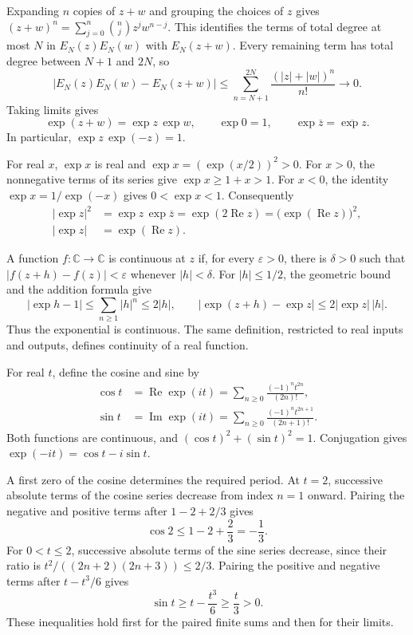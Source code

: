 Expanding $n$ copies of $z+w$ and grouping the choices of $z$ gives
$(z+w)^n=\sum_{j=0}^n\binom nj z^j w^{n-j}$.
This identifies the terms of total degree at most $N$ in
$E_N(z)E_N(w)$ with $E_N(z+w)$.
Every remaining term has total degree between $N+1$ and $2N$, so
\[
 |E_N(z)E_N(w)-E_N(z+w)|
 \leq\sum_{n=N+1}^{2N}\frac{(|z|+|w|)^n}{n!}\longrightarrow0.
\]
Taking limits gives
\[
 \exp(z+w)=\exp z\,\exp w,\qquad
 \exp0=1,\qquad
 \exp\overline z=\overline{\exp z}.
\]
In particular, $\exp z\,\exp(-z)=1$.

For real $x$, $\exp x$ is real and
$\exp x=(\exp(x/2))^2>0$.
For $x>0$, the nonnegative terms of its series give
$\exp x\geq1+x>1$.
For $x<0$, the identity $\exp x=1/\exp(-x)$ gives $0<\exp x<1$.
Consequently
\[
 \begin{aligned}
 |\exp z|^2
   &=\exp z\,\exp\overline z
     =\exp(2\operatorname{Re}z)
     =\bigl(\exp(\operatorname{Re}z)\bigr)^2,\\
 |\exp z|&=\exp(\operatorname{Re}z).
 \end{aligned}
\]

A function $f:\mathbb C\to\mathbb C$ is continuous at $z$ if, for every
$\varepsilon>0$, there is $\delta>0$ such that
$|f(z+h)-f(z)|<\varepsilon$ whenever $|h|<\delta$.
For $|h|\leq1/2$, the geometric bound and the addition formula give
\[
 |\exp h-1|\leq\sum_{n\geq1}|h|^n\leq2|h|,\qquad
 |\exp(z+h)-\exp z|\leq2|\exp z|\,|h|.
\]
Thus the exponential is continuous.
The same definition, restricted to real inputs and outputs, defines
continuity of a real function.

For real $t$, define the cosine and sine by
\[
 \begin{aligned}
 \cos t&=\operatorname{Re}\exp(it)
       =\sum_{n\geq0}\frac{(-1)^nt^{2n}}{(2n)!},\\
 \sin t&=\operatorname{Im}\exp(it)
       =\sum_{n\geq0}\frac{(-1)^nt^{2n+1}}{(2n+1)!}.
 \end{aligned}
\]
Both functions are continuous, and $(\cos t)^2+(\sin t)^2=1$.
Conjugation gives $\exp(-it)=\cos t-i\sin t$.

A first zero of the cosine determines the required period.
At $t=2$, successive absolute terms of the cosine series decrease
from index $n=1$ onward.
Pairing the negative and positive terms after $1-2+2/3$ gives
\[
 \cos2\leq1-2+\frac23=-\frac13.
\]
For $0<t\leq2$, successive absolute terms of the sine series decrease,
since their ratio is $t^2/((2n+2)(2n+3))\leq2/3$.
Pairing the positive and negative terms after $t-t^3/6$ gives
\[
 \sin t\geq t-\frac{t^3}{6}\geq\frac t3>0.
\]
These inequalities hold first for the paired finite sums and then for
their limits.

